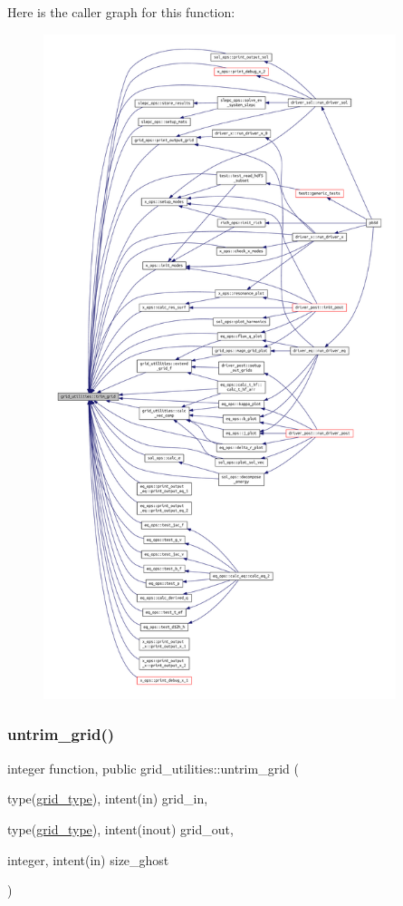 Here is the caller graph for this function\+:
\nopagebreak
\begin{figure}[H]
\begin{center}
\leavevmode
\includegraphics[height=550pt]{namespacegrid__utilities_a67001ff9bbcad707aacf17f90a748d90_icgraph}
\end{center}
\end{figure}
\mbox{\label{namespacegrid__utilities_a4679f24af8e02793070f4e27b43e00b6}} 
\subsubsection{\texorpdfstring{untrim\+\_\+grid()}{untrim\_grid()}}
{\footnotesize\ttfamily integer function, public grid\+\_\+utilities\+::untrim\+\_\+grid (\begin{DoxyParamCaption}\item[{type(\hyperlink{structgrid__vars_1_1grid__type}{grid\+\_\+type}), intent(in)}]{grid\+\_\+in,  }\item[{type(\hyperlink{structgrid__vars_1_1grid__type}{grid\+\_\+type}), intent(inout)}]{grid\+\_\+out,  }\item[{integer, intent(in)}]{size\+\_\+ghost }\end{DoxyParamCaption})}



